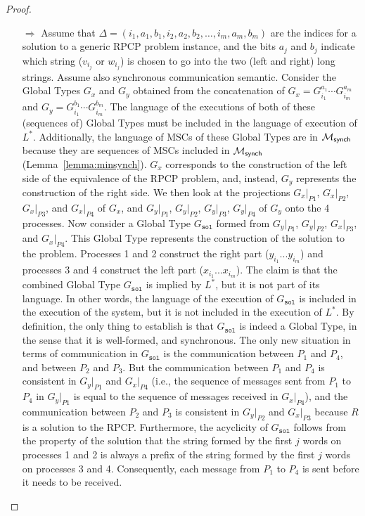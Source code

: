 \begin{proof}
	\begin{itemize}
		\item[$\Rightarrow$]
		      Assume that
		      $\Delta = (i_1, a_1, b_1, i_2, a_2, b_2, \ldots, i_m, a_m, b_m)$ are the indices
		      for a solution to a generic RPCP problem instance, and the bits $a_j$ and
		      $b_j$ indicate which string ($v_{i_j}$ or $w_{i_j}$) is chosen to go into
		      the two (left and right) long strings. Assume also synchronous communication semantic.
			  Consider the Global Types $G_x$ and $G_y$ obtained from the concatenation of
		      $G_x = G^{a_1}_{i_1} \cdots G^{a_m}_{i_m}$ 
			  and $G_y = G^{b_1}_{i_1} \cdots G^{b_m}_{i_m}$.
		      The language of the executions of both of these (sequences of) Global Types 
			  must be included in the language of execution of $L^*$. 
			  Additionally, the language of MSCs of these Global Types are 
			  in $\mathcal{M}_{\mathsf{synch}}$ because they are sequences of MSCs included in
			  $\mathcal{M}_{\mathsf{synch}}$ (Lemma~\ref{lemma:minsynch}).
		      $G_x$ corresponds to the construction of the left side of the equivalence of the RPCP
		      problem, and, instead, $G_y$ represents the construction of the right side.
		      We then look at the projections $G_x|_{P1}$, $G_x|_{P2}$, $G_x|_{P3}$,
		      and $G_x|_{P4}$ of $G_x$, and $G_y|_{P1}$, $G_y|_{P2}$, $G_y|_{P3}$, $G_y|_{P4}$ of $G_y$ onto the
		      4 processes. Now consider a Global Type $G_{\texttt{sol}}$ 
			  formed from $G_y|_{P1}$, $G_y|_{P2}$, $G_x|_{P3}$, and $G_x|_{P4}$.
		      This Global Type represents the construction of the solution to
		      the problem. Processes 1 and 2 construct the right part ($y_{i_1}...y_{i_m}$)
		      and processes 3 and 4 construct the left part ($x_{i_1}...x_{i_m}$).
		      The claim is that the combined Global Type $G_{\texttt{sol}}$ is 
		      implied by $L^*$, but it is not part of its language. 
			  In other words, the language of the execution of $G_{\texttt{sol}}$ is included
			  in the execution of the system, but it is not included in the execution of $L^*$. 
			  By definition, the only thing to establish is that $G_{\texttt{sol}}$
		      is indeed a Global Type, in the sense that it is well-formed,
		      and synchronous.
		      The only new situation in terms of communication in $G_{\texttt{sol}}$ is the
		      communication between $P_1$ and $P_4$, and between $P_2$ and $P_3$.
		      But the communication between $P_1$ and $P_4$ is consistent in
		      $G_y|_{P1}$ and $G_x|_{P4}$ (i.e., the sequence of messages sent from $P_1$ to
		      $P_4$ in $G_y|_{P1}$ is equal to the sequence of messages received in $G_x|_{P4}$),
		      and the communication between $P_2$ and $P_3$ is consistent in
		      $G_y|_{P2}$ and $G_x|_{P3}$ because $R$ is a solution to the RPCP.
		      Furthermore, the acyclicity of $G_{\texttt{sol}}$ follows from the property of the
		      solution that the string formed by the first $j$ words on processes 1
		      and 2 is always a prefix of the string formed by the first $j$ words
		      on processes 3 and 4. Consequently, each message from $P_1$ to $P_4$
		      is sent before it needs to be received.


\end{itemize}
\end{proof}
